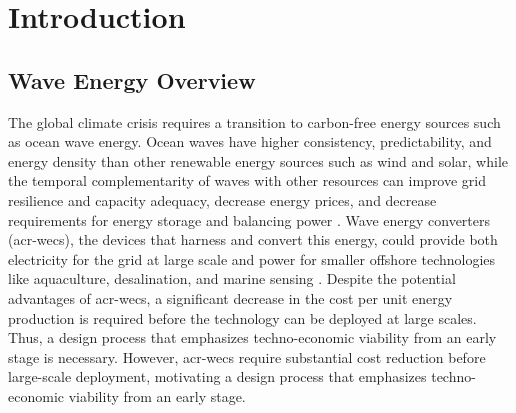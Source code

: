 \section{Introduction}
\label{sec:intro}
\subsection{Wave Energy Overview}

The global climate crisis requires a transition to carbon-free energy sources such as ocean wave energy.
Ocean waves have higher consistency, predictability, and energy density than other renewable energy sources such as wind and solar, while the temporal complementarity of waves with other resources can improve grid resilience and capacity adequacy, decrease energy prices, and decrease requirements for energy storage and balancing power \citep{akdemir_opportunities_2023,bhattacharya_timing_2021,pennock_temporal_2022}.
Wave energy converters (\glspl{acr-wec}), the devices that harness and convert this energy, could provide both electricity for the grid at large scale and power for smaller offshore technologies like aquaculture, desalination, and marine sensing \citep{livecchi_powering_2019}.
\ifdefined\DISSERTATION
Despite the potential advantages of \glspl{acr-wec}, a significant decrease in the cost per unit energy production is required before the technology can be deployed at large scales. %
Thus, a design process that emphasizes techno-economic viability from an early stage is necessary.
\else
    However, \glspl{acr-wec} require substantial cost reduction before large-scale deployment, motivating a design process that emphasizes techno-economic viability from an early stage.
\fi

